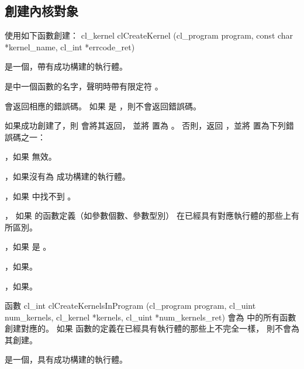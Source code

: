 \subsection{創建內核對象}

使用如下函數創建：
\startclc
cl_kernel clCreateKernel (cl_program program,
			const char *kernel_name,
			cl_int *errcode_ret)
\stopclc

 是一個，帶有成功構建的執行體。

 是中一個函數的名字，聲明時帶有限定符 。

 會返回相應的錯誤碼。
如果  是 ，則不會返回錯誤碼。

如果成功創建了，則  會將其返回，
並將  置為 。
否則，返回 ，並將  置為下列錯誤碼之一：
\startigBase
\item {}，如果  無效。

\item {}，如果沒有為  成功構建的執行體。

\item {}，如果  中找不到 。

\item {}，
如果  的函數定義（如參數個數、參數型別）
在已經具有對應執行體的那些上有所區別。

\item {}，如果  是 。

\item {}，如果\scdevfailres。

\item {}，如果\schostfailres。
\stopigBase

函數
\startclc
cl_int clCreateKernelsInProgram (cl_program program,
			cl_uint num_kernels,
			cl_kernel *kernels,
			cl_uint *num_kernels_ret)
\stopclc
會為  中的所有函數創建對應的。
如果  函數的定義在已經具有執行體的那些上不完全一樣，
則不會為其創建。

 是一個，具有成功構建的執行體。

